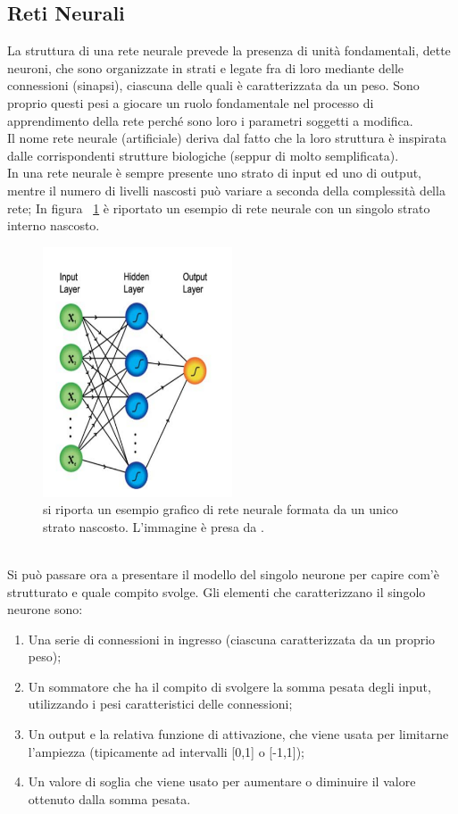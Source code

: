 \subsection{Reti Neurali}
\label{reti neurali}
La struttura di una rete neurale prevede la presenza di unità fondamentali, dette neuroni, che sono organizzate in strati e legate fra di loro mediante delle connessioni (sinapsi), ciascuna delle quali è caratterizzata da un peso. Sono proprio questi pesi a giocare un ruolo fondamentale nel processo di apprendimento della rete perché sono loro i parametri soggetti a modifica.\\
Il nome rete neurale (artificiale) deriva dal fatto che la loro struttura è inspirata dalle corrispondenti strutture biologiche (seppur di molto semplificata). \\
In una rete neurale è sempre presente uno strato di input ed uno di output, mentre il numero di livelli nascosti può variare a seconda della complessità della rete; In figura ~\ref{fig:schemaNN} è riportato un esempio di rete neurale con un singolo strato interno nascosto.
\begin{figure}[h!]
	\centering
	\includegraphics[width=0.50\textwidth]{figs/schemaNN.png}
	\caption{si riporta un esempio grafico di rete neurale formata da un unico strato nascosto. L'immagine è presa da \cite{Metodi_multivariati}.}
	\label{fig:schemaNN}
\end{figure}
\\
Si può passare ora a presentare il modello del singolo neurone per capire com'è strutturato e quale compito svolge.
Gli elementi che caratterizzano il singolo neurone sono:
\begin{enumerate}
	\item Una serie di connessioni in ingresso (ciascuna caratterizzata da un proprio peso);
	\item Un sommatore che ha il compito di svolgere la somma pesata degli input, utilizzando i pesi caratteristici delle connessioni;
	\item Un output e la relativa funzione di attivazione, che viene usata per limitarne l'ampiezza (tipicamente ad intervalli [0,1] o [-1,1]);
	\item Un valore di soglia che viene usato per aumentare o diminuire il valore ottenuto dalla somma pesata.
\end{enumerate}
